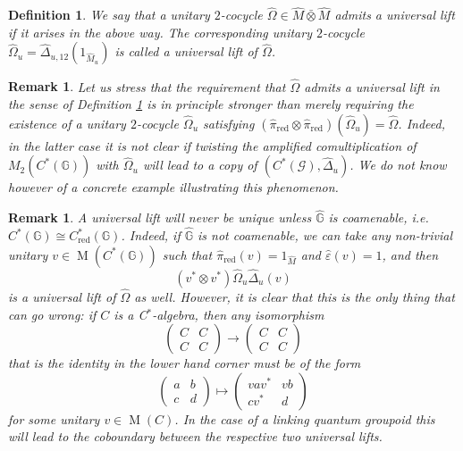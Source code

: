 \documentclass[reqno]{amsart}
\numberwithin{equation}{section}
\newtheorem{Def}[Theorem]{Definition}
\newtheorem{Rem}[Theorem]{Remark}
\newcommand{\C}{\mathbb{C}}
\newcommand{\G}{\mathbb{G}}
\newcommand{\msG}{\mathscr{G}}
\newcommand{\red}{\mathrm{red}}
\newcommand{\eps}{\varepsilon}
\newcommand{\Mult}{\operatorname{M}}
\begin{document}
\begin{Def}\label{DefUnivLift2Coc}
We say that a unitary $2$-cocycle $\hat{\Omega} \in \hat{M}\bar{\otimes}\hat{M}$ \emph{admits a universal lift} if it arises in the above way. The corresponding unitary $2$-cocycle $\hat{\Omega}_u=\hat{\Delta}_{u,12}(1_{\hat{M}_u})$ is called a \emph{universal lift} of $\hat{\Omega}$.
\end{Def}

\begin{Rem}
Let us stress that the requirement that $\hat{\Omega}$ admits a universal lift in the sense of Definition \ref{DefUnivLift2Coc} is in principle stronger than merely requiring the existence of a unitary $2$-cocycle $\hat{\Omega}_u$ satisfying $(\hat{\pi}_{\red}\otimes \hat{\pi}_{\red})(\hat{\Omega}_u)=\hat{\Omega}$. Indeed, in the latter case it is not clear if twisting the amplified comultiplication of $M_2(C^*(\G))$ with $\hat{\Omega}_u$ will lead to a copy of $(C^*(\msG),\hat{\Delta}_u)$. We do not know however of a concrete example illustrating this phenomenon. 
\end{Rem}


\begin{Rem}\label{rem2}
A universal lift will never be unique unless $\hat{\G}$ is coamenable, i.e.\ $C^*(\G)\cong C^*_{\red}(\G)$. Indeed, if $\hat{\G}$ is not coamenable, we can take any non-trivial unitary $v\in \Mult(C^*(\G))$ such that $\hat{\pi}_{\red}(v) = 1_{\hat{M}}$ and $\hat{\eps}(v)=1$, and then 
\[
(v^*\otimes v^*)\hat{\Omega}_u\hat{\Delta}_u(v)
\] 
is a universal lift of $\hat{\Omega}$ as well. However, it is clear that this is the only thing that can go wrong: if $C$ is a C$^*$-algebra, then any isomorphism 
\[
\begin{pmatrix} C & C \\C &C\end{pmatrix} \rightarrow \begin{pmatrix} C & C \\C &C\end{pmatrix}
\]
that is the identity in the lower hand corner must be of the form 
\[
\begin{pmatrix} a & b \\ c &  d \end{pmatrix} \mapsto \begin{pmatrix} vav^* & vb \\ cv^* & d\end{pmatrix}
\]
for some unitary $v\in \Mult(C)$. In the case of a linking quantum groupoid this will lead to the coboundary between the respective two universal lifts. 
\end{Rem}
\end{document}
